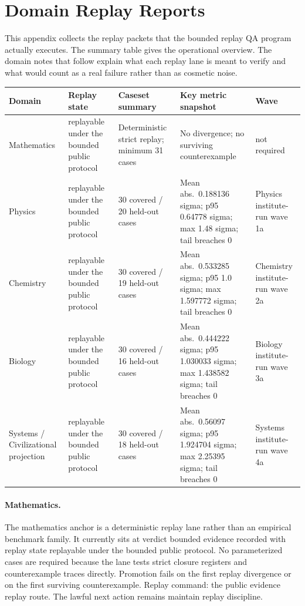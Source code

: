 \section{Domain Replay Reports}
\label{sec:oc-core-1-3-domain-replay-reports}

This appendix collects the replay packets that the bounded replay QA program
actually executes. The summary table gives the operational overview. The domain
notes that follow explain what each replay lane is meant to verify and what
would count as a real failure rather than as cosmetic noise.

\begingroup
\footnotesize
\RaggedRight
\setlength{\tabcolsep}{2pt}
\setlength{\LTleft}{0pt}
\setlength{\LTright}{0pt}

\begin{table}[htbp]
\centering
\begin{tabular}{@{}L{0.15\textwidth}L{0.13\textwidth}L{0.20\textwidth}L{0.27\textwidth}L{0.13\textwidth}@{}}
\toprule
Domain & Replay state & Caseset summary & Key metric snapshot & Wave \\
\midrule
Mathematics & replayable under the bounded public protocol & Deterministic strict replay; minimum 31 cases & No divergence; no surviving counterexample & not required \\
Physics & replayable under the bounded public protocol & 30 covered / 20 held-out cases & Mean abs.\ 0.188136 sigma; p95 0.64778 sigma; max 1.48 sigma; tail breaches 0 & Physics institute-run wave 1a \\
Chemistry & replayable under the bounded public protocol & 30 covered / 19 held-out cases & Mean abs.\ 0.533285 sigma; p95 1.0 sigma; max 1.597772 sigma; tail breaches 0 & Chemistry institute-run wave 2a \\
Biology & replayable under the bounded public protocol & 30 covered / 16 held-out cases & Mean abs.\ 0.444222 sigma; p95 1.030033 sigma; max 1.438582 sigma; tail breaches 0 & Biology institute-run wave 3a \\
Systems / Civilizational projection & replayable under the bounded public protocol & 30 covered / 18 held-out cases & Mean abs.\ 0.56097 sigma; p95 1.924704 sigma; max 2.25395 sigma; tail breaches 0 & Systems institute-run wave 4a \\
\bottomrule
\end{tabular}
\end{table}

\paragraph{Mathematics.}
The mathematics anchor is a deterministic replay lane rather than an empirical
benchmark family. It currently sits at verdict bounded evidence recorded with replay state
replayable under the bounded public protocol. No parameterized cases are required because the lane
tests strict closure registers and counterexample traces directly. Promotion
fails on the first replay divergence or on the first surviving counterexample.
Replay command:
the public evidence replay route. The
lawful next action remains maintain replay discipline.

